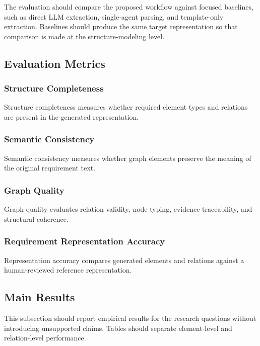 The evaluation should compare the proposed workflow against focused baselines, such as direct LLM extraction, single-agent parsing, and template-only extraction.
Baselines should produce the same target representation so that comparison is made at the structure-modeling level.

\subsection{Evaluation Metrics}
\label{sec:exp-metrics}

\subsubsection{Structure Completeness}
\label{sec:exp-completeness}

Structure completeness measures whether required element types and relations are present in the generated representation.

\subsubsection{Semantic Consistency}
\label{sec:exp-consistency}

Semantic consistency measures whether graph elements preserve the meaning of the original requirement text.

\subsubsection{Graph Quality}
\label{sec:exp-graph-quality}

Graph quality evaluates relation validity, node typing, evidence traceability, and structural coherence.

\subsubsection{Requirement Representation Accuracy}
\label{sec:exp-accuracy}

Representation accuracy compares generated elements and relations against a human-reviewed reference representation.

\subsection{Main Results}
\label{sec:exp-main-results}

This subsection should report empirical results for the research questions without introducing unsupported claims.
Tables should separate element-level and relation-level performance.

